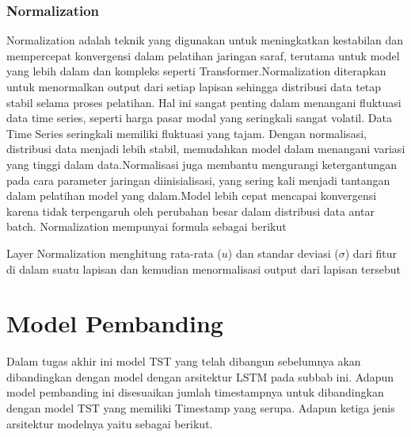 
\subsubsection{Normalization}
Normalization adalah teknik yang digunakan untuk meningkatkan kestabilan dan mempercepat konvergensi dalam pelatihan jaringan saraf, terutama untuk model yang lebih dalam dan kompleks seperti Transformer.Normalization diterapkan untuk menormalkan output dari setiap lapisan sehingga distribusi data tetap stabil selama proses pelatihan. Hal ini sangat penting dalam menangani fluktuasi data time series, seperti harga pasar modal yang seringkali sangat volatil. Data Time Series seringkali memiliki fluktuasi yang tajam. Dengan normalisasi, distribusi data menjadi lebih stabil, memudahkan model dalam menangani variasi yang tinggi dalam data.Normalisasi juga membantu mengurangi ketergantungan pada cara parameter jaringan diinisialisasi, yang sering kali menjadi tantangan dalam pelatihan model yang dalam.Model lebih cepat mencapai konvergensi karena tidak terpengaruh oleh perubahan besar dalam distribusi data antar batch. Normalization mempunyai formula sebagai berikut

Layer Normalization menghitung rata-rata (\( u \)) dan standar deviasi ($\sigma$) dari fitur di dalam suatu lapisan dan kemudian menormalisasi output dari lapisan tersebut

\section{Model Pembanding}
Dalam tugas akhir ini model TST yang telah dibangun sebelumnya akan dibandingkan dengan model dengan arsitektur LSTM pada subbab ini. Adapun model pembanding ini disesuaikan jumlah timestampnya untuk dibandingkan dengan model TST yang memiliki Timestamp yang serupa. Adapun ketiga jenis arsitektur modelnya yaitu sebagai berikut.

